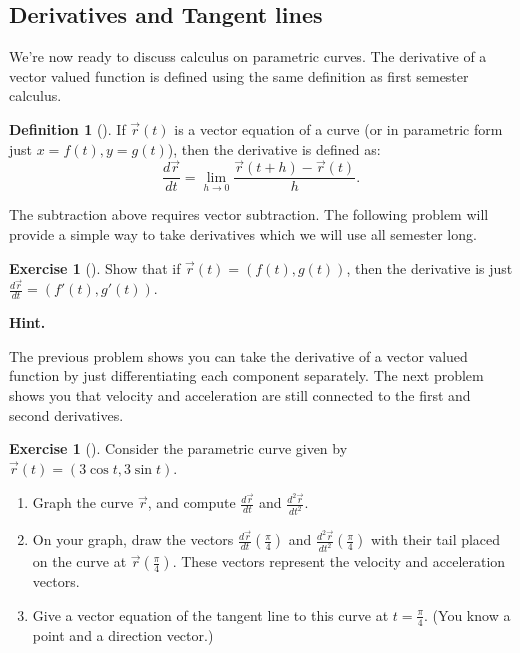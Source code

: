 \documentclass[10pt,]{book}
\theoremstyle{plain}
\theoremstyle{definition}
\newtheorem{definition}[theorem]{Definition}
\theoremstyle{definition}
\theoremstyle{definition}
\theoremstyle{definition}
\newtheorem{exploration}[project]{Exercise}
\theoremstyle{definition}
\numberwithin{equation}{section}
\newcommand{\ds}{\displaystyle}
\begin{document}
\subsection[{Derivatives and Tangent lines}]{Derivatives and Tangent lines}\label{sec_derivatives_and_tangent_lines}
We're now ready to discuss calculus on parametric curves. The derivative of a vector valued function is defined using the same definition as first semester calculus.%
\begin{definition}[{}]\label{definition-19}
If \(\vec r(t)\) is a vector equation of a curve (or in parametric form just \(x=f(t), y=g(t)\)), then the derivative is defined as:%
\begin{equation*}
\frac{d\vec r}{dt}=\ds\lim_{h\to 0}\frac{\vec r(t+h)-\vec r(t)}{h}.
\end{equation*}
%
\end{definition}
The subtraction above requires vector subtraction. The following problem will provide a simple way to take derivatives which we will use all semester long.%
\begin{exploration}[]\label{exploration-77}
Show that if \(\vec r(t) = (f(t),g(t))\), then the derivative is just \(\frac{d\vec r}{dt} = (f'(t),g'(t))\).%
\par\medskip\noindent%
\textbf{Hint.}\quad [The definition above says that \(\frac{d\vec r}{dt}=\ds\lim_{h\to 0}\frac{\vec r(t+h)-\vec r(t)}{h}\). We were told \(\vec r(t) = (f(t),g(t))\), so use this in the derivative definition. Then try to modify the equation to obtain \(\frac{d\vec r}{dt} = (f'(t),g'(t))\).]%
\end{exploration}
The previous problem shows you can take the derivative of a vector valued function by just differentiating each component separately. The next problem shows you that velocity and acceleration are still connected to the first and second derivatives.%
\begin{exploration}[]\label{exploration-78}
Consider the parametric curve given by \(\vec r(t)=( 3\cos t, 3\sin t )\).%
\begin{enumerate}[font=\bfseries,label=(\alph*),ref=\alph*]
\item\label{task-125} Graph the curve \(\vec r\), and compute \(\frac{d\vec r}{dt}\) and \(\frac{d^2\vec r}{dt^2}\).%
\item\label{task-126} On your graph, draw the vectors \(\frac{d\vec r}{dt}\left(\frac{\pi}{4}\right)\) and \(\frac{d^2\vec r}{dt^2}\left(\frac{\pi}{4}\right)\) with their tail placed on the curve at \(\vec r\left(\frac{\pi}{4}\right)\). These vectors represent the velocity and acceleration vectors.%
\item\label{task-127} Give a vector equation of the tangent line to this curve at \(t=\frac{\pi}{4}\). (You know a point and a direction vector.)%
\end{enumerate}
\end{exploration}
\end{document}
